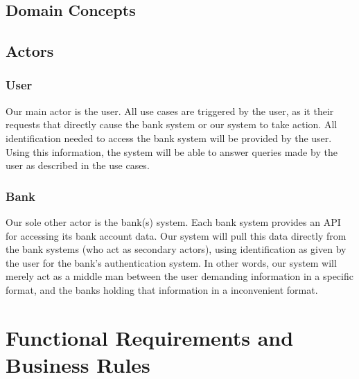 \documentclass[11pt]{article}
\newcounter{use case ID}
\newcounter{req ID}
\begin{document}
\subsection{Domain Concepts}



\subsection{Actors}
\subsubsection{User}
Our main actor is the user. All use cases are triggered by the user, as it their requests that directly cause the bank system or our system to take action. All identification needed to access the bank system will be provided by the user. Using this information, the system will be able to answer queries made by the user as described in the use cases.
\subsubsection{Bank}
Our sole other actor is the bank(s) system. Each bank system provides an API for accessing its bank account data. Our system will pull this data directly from the bank systems (who act as secondary actors), using identification as given by the user for the bank's authentication system. In other words, our system will merely act as a middle man between the user demanding information in a specific format, and the banks holding that information in a inconvenient format.


\section{Functional Requirements and Business Rules}
\end{document}
